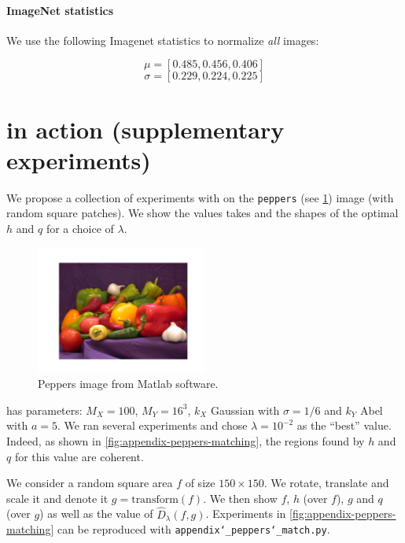 \paragraph{ImageNet statistics}
We use the following Imagenet statistics to normalize \emph{all} images:

$$ \mu = [0.485, 0.456, 0.406]$$
$$ \sigma =[0.229, 0.224, 0.225]$$

\clearpage
\section{\Diffy in action (supplementary experiments)} \label{app:additional-experiments}

We propose a collection of experiments with \Diffy on the \texttt{peppers} (see \cref{fig:peppers}) image (with random square patches). We show the values \Diffy takes and the shapes of the optimal $h$ and $q$ for a choice of $\lambda$.

\begin{figure}[!h]
    \centering
    \includegraphics[width=0.5\textwidth]{ch1-diffy/figures/peppers.pdf}
    \caption{Peppers image from Matlab software.}
    \label{fig:peppers}
\end{figure}

\Diffy has parameters: $M_X = 100$, $M_Y = 16^3$, $k_X$ Gaussian with $\sigma = 1/6$ and $k_Y$ Abel with $a=5$. We ran several experiments and chose $\lambda = 10^{-2}$ as the ``best'' value. Indeed, as shown in \cref{fig:appendix-peppers-matching}, the regions found by $h$ and $q$ for this value are coherent.

We consider a random square area $f$ of size $150 \times 150$. We rotate, translate and scale it and denote it $g = \textrm{transform}(f)$. We then show $f$, $h$ (over $f$), $g$ and $q$ (over $g$) as well as the value of $\widehat D_\lambda(f, g)$. Experiments in \cref{fig:appendix-peppers-matching} can be reproduced with \texttt{appendix\char`_peppers\char`_match.py}.

